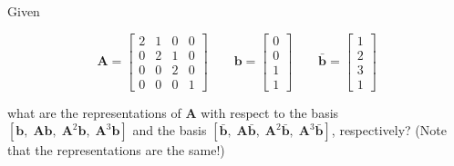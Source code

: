 \item [3.12] Given

\begin{equation*}
 \mathbf{A} = \begin{bmatrix}
      2 & 1 & 0 & 0 \\
      0 & 2 & 1 & 0 \\
      0 & 0 & 2 & 0 \\
      0 & 0 & 0 & 1
     \end{bmatrix}
\qquad
\mathbf{b} = \begin{bmatrix}
     0 \\
     0 \\
     1 \\
     1
    \end{bmatrix}
\qquad
\bar{\mathbf{b}} = \begin{bmatrix}
          1 \\
          2\\
          3\\
          1
         \end{bmatrix}
\end{equation*}

what are the representations of $\mathbf{A}$
with respect to the basis\\
$[\mathbf{b}, \; \mathbf{A}\mathbf{b}, \; \mathbf{A}^2 \mathbf{b},\; \mathbf{A}^3\mathbf{b}]$
and the basis
$[\bar{\mathbf{b}}, \; \mathbf{A} \bar{\mathbf{b}}, \; \mathbf{A}^2 \bar{\mathbf{b}},\; \mathbf{A}^3 \bar{\mathbf{b}}]$, respectively?
(Note that the representations are the same!)

